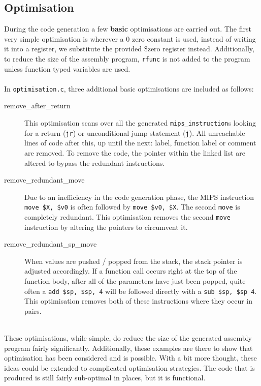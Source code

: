 \subsection{Optimisation}
\label{sec:opt}
During the code generation a few \textbf{basic} optimisations are carried out. The first very simple optimisation is wherever a 0 zero constant is used, instead of writing it into a register, we substitute the provided \$zero register instead. Additionally, to reduce the size of the assembly program, \verb!rfunc! is not added to the program unless function typed variables are used.
\ \\ \ \\
In \verb!optimisation.c!, three additional basic optimisations are included as follows:
\begin{description}
	\item[remove\_after\_return] This optimisation scans over all the generated \verb!mips_instruction!s looking for a return (\verb!jr!) or unconditional jump statement (\verb!j!). All unreachable lines of code after this, up until the next: label, function label or comment are removed. To remove the code, the pointer within the linked list are altered to bypass the redundant instructions.
	\item[remove\_redundant\_move] Due to an inefficiency in the code generation phase, the MIPS instruction \verb!move $X, $v0! is often followed by \verb!move $v0, $X!. The second \verb!move! is completely redundant. This optimisation removes the second \verb!move! instruction by altering the pointers to circumvent it.
	\item[remove\_redundant\_sp\_move] When values are pushed / popped from the stack, the stack pointer is adjusted accordingly. If a function call occurs right at the top of the function body, after all of the parameters have just been popped, quite often a \verb!add $sp, $sp, 4! will be followed directly with a \verb!sub $sp, $sp 4!. This optimisation removes both of these instructions where they occur in pairs.
\end{description}
\ \\
These optimisations, while simple, do reduce the size of the generated assembly program fairly significantly. Additionally, these examples are there to show that optimisation has been considered and is possible. With a bit more thought, these ideas could be extended to complicated optimisation strategies. The code that is produced is still fairly sub-optimal in places, but it is functional.


